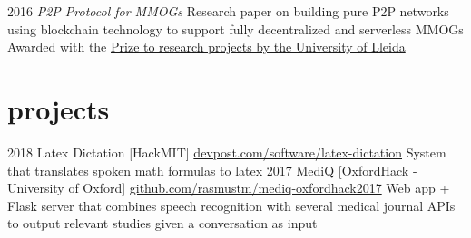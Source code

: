 \documentclass[]{friggeri-cv}
\begin{document}
\begin{entrylist}
  \entry
    {2016}
    {\emph{P2P Protocol for MMOGs}}
    {}
    {Research paper on building pure P2P networks using blockchain technology to support fully decentralized and serverless MMOGs
    \\Awarded with the \href{http://eps.blogs.udl.cat/2016/06/29/argelichrecerca/}{Prize to research projects by the University of Lleida}
    }
\end{entrylist}

\section{projects}

\begin{entrylist}
  \entry
    {2018}
    {Latex Dictation [HackMIT]}
    {\href{https://devpost.com/software/latex-dictation}{devpost.com/software/latex-dictation}}
    {System that translates spoken math formulas to latex}
  \entry
    {2017}
    {MediQ [OxfordHack - University of Oxford]}
    {\href{https://github.com/rasmustm/mediq-oxfordhack2017}{github.com/rasmustm/mediq-oxfordhack2017}}
    {Web app + Flask server that combines speech recognition with several medical journal APIs to output relevant studies given a conversation as input}
\end{entrylist}
\end{document}
